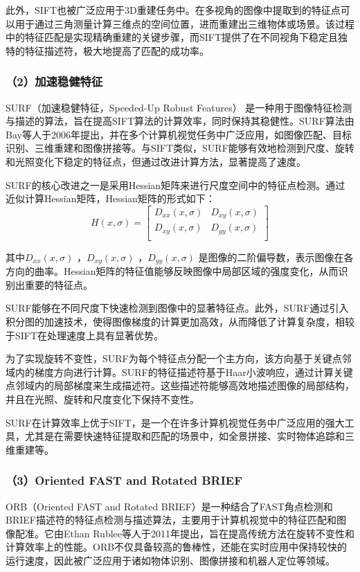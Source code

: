 此外，SIFT也被广泛应用于3D重建任务中。在多视角的图像中提取到的特征点可以用于通过三角测量计算三维点的空间位置，进而重建出三维物体或场景。该过程中的特征匹配是实现精确重建的关键步骤，而SIFT提供了在不同视角下稳定且独特的特征描述符，极大地提高了匹配的成功率。
 \subsubsection*{（2）加速稳健特征}
SURF（加速稳健特征，Speeded-Up Robust Features） 是一种用于图像特征检测与描述的算法，旨在提高SIFT算法的计算效率，同时保持其稳健性。SURF算法由Bay等人于2006年提出，并在多个计算机视觉任务中广泛应用，如图像匹配、目标识别、三维重建和图像拼接等。与SIFT类似，SURF能够有效地检测到尺度、旋转和光照变化下稳定的特征点，但通过改进计算方法，显著提高了速度。

SURF的核心改进之一是采用Hessian矩阵来进行尺度空间中的特征点检测。通过近似计算Hessian矩阵，Hessian矩阵的形式如下：
\begin{equation}
	\label{equ:Hessian}
	H(x,\sigma) =
	\begin{bmatrix}
		D_{xx}(x,\sigma) & D_{xy}(x,\sigma)  \\
		D_{xy}(x,\sigma)  & D_{yy}(x,\sigma) \\
	\end{bmatrix}
\end{equation}

其中$D_{xx}(x,\sigma)$ ，$D_{xy}(x,\sigma)$ ，$D_{yy}(x,\sigma)$ 是图像的二阶偏导数，表示图像在各方向的曲率。Hessian矩阵的特征值能够反映图像中局部区域的强度变化，从而识别出重要的特征点。

SURF能够在不同尺度下快速检测到图像中的显著特征点。此外，SURF通过引入积分图的加速技术，使得图像梯度的计算更加高效，从而降低了计算复杂度，相较于SIFT在处理速度上具有显著优势。

为了实现旋转不变性，SURF为每个特征点分配一个主方向，该方向基于关键点邻域内的梯度方向进行计算。SURF的特征描述符基于Haar小波响应，通过计算关键点邻域内的局部梯度来生成描述符。这些描述符能够高效地描述图像的局部结构，并且在光照、旋转和尺度变化下保持不变性。

SURF在计算效率上优于SIFT，是一个在许多计算机视觉任务中广泛应用的强大工具，尤其是在需要快速特征提取和匹配的场景中，如全景拼接、实时物体追踪和三维重建等。
 \subsubsection*{（3）Oriented FAST and Rotated BRIEF}
ORB（Oriented FAST and Rotated BRIEF）是一种结合了FAST角点检测和BRIEF描述符的特征点检测与描述算法，主要用于计算机视觉中的特征匹配和图像配准。它由Ethan Rublee等人于2011年提出，旨在提高传统方法在旋转不变性和计算效率上的性能。ORB不仅具备较高的鲁棒性，还能在实时应用中保持较快的运行速度，因此被广泛应用于诸如物体识别、图像拼接和机器人定位等领域。

